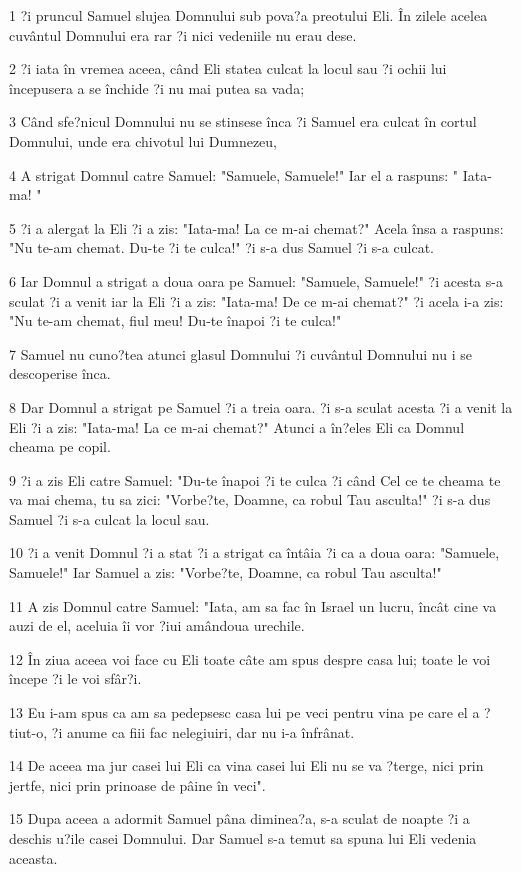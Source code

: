 \par 1 ?i pruncul Samuel slujea Domnului sub pova?a preotului Eli. În zilele acelea cuvântul Domnului era rar ?i nici vedeniile nu erau dese.
\par 2 ?i iata în vremea aceea, când Eli statea culcat la locul sau ?i ochii lui începusera a se închide ?i nu mai putea sa vada;
\par 3 Când sfe?nicul Domnului nu se stinsese înca ?i Samuel era culcat în cortul Domnului, unde era chivotul lui Dumnezeu,
\par 4 A strigat Domnul catre Samuel: "Samuele, Samuele!" Iar el a raspuns: " Iata-ma! "
\par 5 ?i a alergat la Eli ?i a zis: "Iata-ma! La ce m-ai chemat?" Acela însa a raspuns: "Nu te-am chemat. Du-te ?i te culca!" ?i s-a dus Samuel ?i s-a culcat.
\par 6 Iar Domnul a strigat a doua oara pe Samuel: "Samuele, Samuele!" ?i acesta s-a sculat ?i a venit iar la Eli ?i a zis: "Iata-ma! De ce m-ai chemat?" ?i acela i-a zis: "Nu te-am chemat, fiul meu! Du-te înapoi ?i te culca!"
\par 7 Samuel nu cuno?tea atunci glasul Domnului ?i cuvântul Domnului nu i se descoperise înca.
\par 8 Dar Domnul a strigat pe Samuel ?i a treia oara. ?i s-a sculat acesta ?i a venit la Eli ?i a zis: "Iata-ma! La ce m-ai chemat?" Atunci a în?eles Eli ca Domnul cheama pe copil.
\par 9 ?i a zis Eli catre Samuel: "Du-te înapoi ?i te culca ?i când Cel ce te cheama te va mai chema, tu sa zici: "Vorbe?te, Doamne, ca robul Tau asculta!" ?i s-a dus Samuel ?i s-a culcat la locul sau.
\par 10 ?i a venit Domnul ?i a stat ?i a strigat ca întâia ?i ca a doua oara: "Samuele, Samuele!" Iar Samuel a zis: "Vorbe?te, Doamne, ca robul Tau asculta!"
\par 11 A zis Domnul catre Samuel: "Iata, am sa fac în Israel un lucru, încât cine va auzi de el, aceluia îi vor ?iui amândoua urechile.
\par 12 În ziua aceea voi face cu Eli toate câte am spus despre casa lui; toate le voi începe ?i le voi sfâr?i.
\par 13 Eu i-am spus ca am sa pedepsesc casa lui pe veci pentru vina pe care el a ?tiut-o, ?i anume ca fiii fac nelegiuiri, dar nu i-a înfrânat.
\par 14 De aceea ma jur casei lui Eli ca vina casei lui Eli nu se va ?terge, nici prin jertfe, nici prin prinoase de pâine în veci".
\par 15 Dupa aceea a adormit Samuel pâna diminea?a, s-a sculat de noapte ?i a deschis u?ile casei Domnului. Dar Samuel s-a temut sa spuna lui Eli vedenia aceasta.
